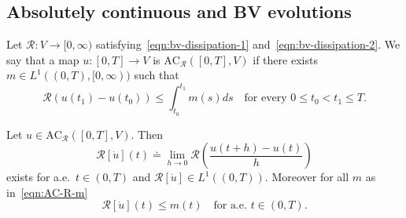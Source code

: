 \subsection{Absolutely continuous and BV evolutions}

Let $\mathcal{R}\colon V\to[0,\infty)$ satisfying~\eqref{eqn:bv-dissipation-1} and~\eqref{eqn:bv-dissipation-2}. We say that a map $u\colon[0,T]\to V$ is $\text{AC}_\mathcal{R}([0,T],V)$ if there exists $m\in L^1((0,T),[0,\infty))$ such that
\begin{equation}
\label{eqn:AC-R-m}
\mathcal{R}(u(t_1)-u(t_0))\le\int_{t_0}^{t_1}m(s)ds\quad\text{for every $0\le t_0<t_1\le T$}.
\end{equation}
\begin{lemma}
Let $u\in\text{AC}_\mathcal{R}([0,T],V)$. Then
\begin{equation*}
\mathcal{R}[\dot u](t)\doteq\lim_{h\to0}\mathcal{R}\left(\frac{u(t+h)-u(t)}{h}\right)
\end{equation*}
exists for a.e.\ $t\in(0,T)$ and $\mathcal{R}[\dot u]\in L^1((0,T))$. Moreover for all $m$ as in~\eqref{eqn:AC-R-m}
\begin{equation*}
\mathcal{R}[\dot u](t)\le m(t)\quad\text{for a.e.\ $t\in(0,T)$}.
\end{equation*}
\end{lemma}
